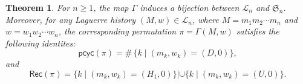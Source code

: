 \documentclass[12pt]{article}
\numberwithin{equation}{section}
\theoremstyle{plain}
\newtheorem{theorem}{Theorem}[section]
\def\Rec{\mathsf{Rec}}
\def\pcyc{\mathsf{pcyc}}
\begin{document}
    	 \begin{theorem}\label{thm-Gamma}
    	 	For $n\geq 1$, the map $\Gamma$ induces a bijection between $\mathcal{L}_n$ and $\mathfrak{S}_n$. Moreover, for any Laguerre history $(M,w)\in\mathcal{L}_n$, where $M=m_1m_2\cdots m_n$ and $w=w_1w_2\cdots w_n$, the corresponding permutation $\pi=\Gamma(M,w)$ satisfies the following identites: 
    	 	\begin{equation}\label{eq-pcyc}
    	 		\pcyc(\pi)=\#\, \{k\mid (m_k, w_k)=(D, 0)\},
    	 	\end{equation}	 
    	 	and 
    	 	\begin{equation}\label{eq-Rec-Gamma}
    	 		\Rec(\pi)=\{k\mid (m_k, w_k)=(H_1, 0)\}| \cup\{k\mid (m_k, w_k)=(U, 0)\}.
    	 	\end{equation}
    	 	\end{theorem}
\end{document}
